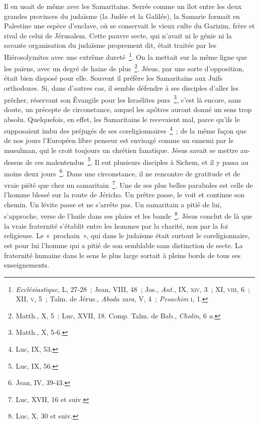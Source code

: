 \documentclass[french,twoside]{book} %
\begin{document}
Il en usait de même avec les Samaritains. Serrée comme un îlot entre les deux grandes provinces du judaïsme (la Judée et la Galilée), la Samarie formait en Palestine une espèce d’enclave, où se conservait le vieux culte du Garizim, frère et rival de celui de Jérusalem. Cette pauvre secte, qui n’avait ni le génie ni la savante organisation du judaïsme proprement dit, était traitée par les Hiérosolymites avec une extrême dureté \footnote{{\itshape Ecclésiastique}, L, 27-28 ; Jean, VIII, 48 ; Jos., {\itshape Ant.}, IX, \textsc{xiv}, 3 ; XI, \textsc{viii}, 6 ; XII, \textsc{v}, 5 ; Talm. de Jérus., {\itshape Aboda zara}, V, 4 ; {\itshape Pesachim} \textsc{i}, 1.}. On la mettait sur la même ligne que les païens, avec un degré de haine de plus \footnote{ Matth., X, 5 ; Luc, XVII, 18. Comp. Talm. de Bab., {\itshape Cholin}, 6 {\itshape a}.}. Jésus, par une sorte d’opposition, était bien disposé pour elle. Souvent il préfère les Samaritains aux Juifs orthodoxes. Si, dans d’autres cas, il semble défendre à ses disciples d’aller les prêcher, réservant son Évangile pour les Israélites purs \footnote{Matth., X, 5-6.}, c’est là encore, sans doute, un précepte de circonstance, auquel les apôtres auront donné un sens trop absolu. Quelquefois, en effet, les Samaritains le recevaient mal, parce qu’ils le supposaient imbu des préjugés de ses coreligionnaires \footnote{Luc, IX, 53.} ; de la même façon que de nos jours l’Européen libre penseur est envisagé comme un ennemi par le musulman, qui le croit toujours un chrétien fanatique. Jésus savait se mettre au-dessus de ces malentendus \footnote{Luc, IX, 56.}. Il eut plusieurs disciples à Sichem, et il y passa au moins deux jours \footnote{Jean, IV, 39-43.}. Dans une circonstance, il ne rencontre de gratitude et de vraie piété que chez un samaritain \footnote{Luc, XVII, 16 et suiv.}. Une de ses plus belles paraboles est celle de l’homme blessé sur la route de Jéricho. Un prêtre passe, le voit et continue son chemin. Un lévite passe et ne s’arrête pas. Un samaritain a pitié de lui, s’approche, verse de l’huile dans ses plaies et les bande \footnote{Luc, X, 30 et suiv.}. Jésus conclut de là que la vraie fraternité s’établit entre les hommes par la charité, non par la foi religieuse. Le « prochain », qui dans le judaïsme était surtout le coreligionnaire, est pour lui l’homme qui a pitié de son semblable sans distinction de secte. La fraternité humaine dans le sens le plus large sortait à pleins bords de tous ses enseignements.\par
\end{document}
